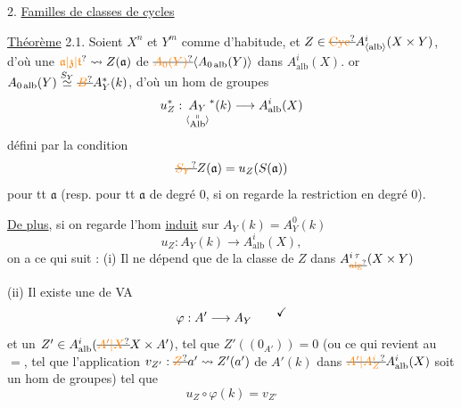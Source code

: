 2. \uline{Familles de classes de cycles  }

\uline{Théorème} 2.1. Soient $X^n$ et $Y^m$ comme d'habitude,
et $Z\in\deleted{\unsure{\operatorname{Cyc}}}A^{i}_{\inserted{\mathrm{alb}}}(X\times Y)$, d'où une  
$\unsure{\mathfrak{a}|\mathfrak{z}|\mathfrak{t}}\leadsto Z(\mathfrak{a})$ de $\deleted{\unsure{A_0(Y)}}\inserted{A_{0\,\mathrm{alb}}(Y)}$ dans $A^i_{\mathrm{alb}}(X)$.  or $A_{0\,\mathrm{alb}}(Y)\overset{S_Y}{\simeq}\deleted{\unsure{B}}A_Y^*(k)$,
d'où un hom de groupes
\[
u_Z^*:\underset{\inserted{\substack{\shortparallel\\\mathrm{Alb}}}}{A_Y}^{*}(k)\longrightarrow A^i_{\mathrm{alb}}(X)
\]
 défini par la
condition
\[
\deleted{\unsure{S_Y}}Z(\mathfrak{a})=u_Z(S(\mathfrak{a}))
\]
pour tt $\mathfrak{a}$ (resp. pour tt $\mathfrak{a}$ de degré 0,
si on regarde la restriction en degré 0).

\uline{De plus}, si on regarde l'hom \uline{induit}
sur $A_Y(k)=A_Y^0(k)$
\[
u_Z:A_Y(k)\longrightarrow A^i_{\mathrm{alb}}(X),
\]
on a ce qui suit : 
(i) Il ne dépend que de la classe de $Z$ dans
$A^{i\,\tau}_{\deleted{\unsure{\mathrm{alg}}}}(X\times Y)$ \margin{[A réserver pour plus tard}

(ii) Il existe une 
de VA
\[
\varphi:A'\longrightarrow A_Y
\qquad\text{\raisebox{1ex}{$\checkmark$}}
\]
et un $Z'\in A^i_{\mathrm{alb}}(\deleted{\unsure{A'|X}}X\times A')$,  tel que
$Z'((0_{A'}))=0$  (ou ce qui revient au $=$, tel que
l'application $v_{Z'}:\deleted{\unsure{Z}}a'\leadsto Z'(a')$ de $A'(k)$ dans $\deleted{\unsure{A'|A^i_Z}}A^i_{\mathrm{alb}}(X)$
soit un hom de groupes) tel que
\[
u_Z\circ\varphi(k)=v_{Z'}
\]

